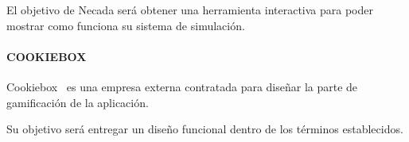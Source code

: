 El objetivo de Necada será obtener una herramienta interactiva para poder mostrar como funciona su sistema de simulación.
\paragraph{COOKIEBOX}
Cookiebox~\cite{cookiebox} es una empresa externa contratada para diseñar la parte de gamificación de la aplicación.

Su objetivo será entregar un diseño funcional dentro de los términos establecidos.
